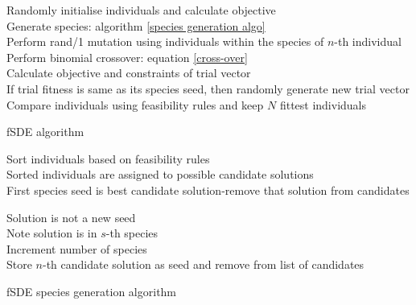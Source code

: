 \begin{algorithm}[!htbp]
\SetAlgoNoLine
 Randomly initialise individuals and calculate objective\\
 {
 Generate species: algorithm \ref{species generation algo} \\
  {
  Perform rand/1 mutation using individuals within the species of $n$-th individual \\
  Perform binomial crossover: equation \ref{cross-over}\\
  Calculate objective and constraints of trial vector\\
  If trial fitness is same as its species seed, then randomly generate new trial vector
  }
 Compare individuals using feasibility rules and keep $N$ fittest individuals
 }
 \caption{fSDE algorithm}
 \label{fSDE algorithm}
\end{algorithm}

\begin{algorithm}[!htbp]
\SetAlgoNoLine
 Sort individuals based on feasibility rules\\
 Sorted individuals are assigned to possible candidate solutions\\
 First species seed is best candidate solution-remove that solution from candidates\\
  {
  {
  {
  Solution is not a new seed\\
  Note solution is in $s$-th species\\
  }
  }
  {
  Increment number of species \\
  Store $n$-th candidate solution as seed and remove from list of candidates\\
  }

  }
 
 \caption{fSDE species generation algorithm}
 \label{species generation algo}
\end{algorithm}